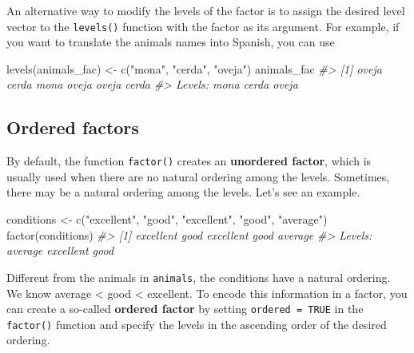 \documentclass[
]{book}
\newenvironment{Shaded}{\begin{snugshade}}{\end{snugshade}}
\newcommand{\CommentTok}[1]{\textcolor[rgb]{0.56,0.35,0.01}{\textit{#1}}}
\newcommand{\FunctionTok}[1]{\textcolor[rgb]{0.00,0.00,0.00}{#1}}
\newcommand{\NormalTok}[1]{#1}
\newcommand{\OtherTok}[1]{\textcolor[rgb]{0.56,0.35,0.01}{#1}}
\newcommand{\StringTok}[1]{\textcolor[rgb]{0.31,0.60,0.02}{#1}}
\begin{document}
An alternative way to modify the levels of the factor is to assign the desired level vector to the \texttt{levels()} function with the factor as its argument. For example, if you want to translate the animals names into Spanish, you can use

\begin{Shaded}
\begin{Highlighting}[]
\FunctionTok{levels}\NormalTok{(animals\_fac) }\OtherTok{\textless{}{-}} \FunctionTok{c}\NormalTok{(}\StringTok{"mona"}\NormalTok{, }\StringTok{"cerda"}\NormalTok{, }\StringTok{"oveja"}\NormalTok{)}
\NormalTok{animals\_fac}
\CommentTok{\#\textgreater{} [1] oveja cerda mona  oveja oveja cerda}
\CommentTok{\#\textgreater{} Levels: mona cerda oveja}
\end{Highlighting}
\end{Shaded}

\hypertarget{ordered-factors}{%
\subsection{Ordered factors}\label{ordered-factors}}

By default, the function \texttt{factor()} creates an \textbf{unordered factor}, which is usually used when there are no natural ordering among the levels. Sometimes, there may be a natural ordering among the levels. Let's see an example.

\begin{Shaded}
\begin{Highlighting}[]
\NormalTok{conditions }\OtherTok{\textless{}{-}} \FunctionTok{c}\NormalTok{(}\StringTok{"excellent"}\NormalTok{, }\StringTok{"good"}\NormalTok{, }\StringTok{"excellent"}\NormalTok{, }\StringTok{"good"}\NormalTok{, }\StringTok{"average"}\NormalTok{)}
\FunctionTok{factor}\NormalTok{(conditions)}
\CommentTok{\#\textgreater{} [1] excellent good      excellent good      average  }
\CommentTok{\#\textgreater{} Levels: average excellent good}
\end{Highlighting}
\end{Shaded}

Different from the animals in \texttt{animals}, the conditions have a natural ordering. We know average \textless{} good \textless{} excellent. To encode this information in a factor, you can create a so-called \textbf{ordered factor} by setting \texttt{ordered\ =\ TRUE} in the \texttt{factor()} function and specify the levels in the ascending order of the desired ordering.
\end{document}
